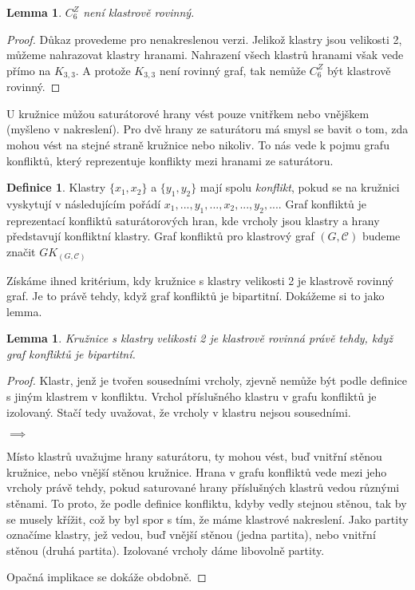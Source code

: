 \documentclass[12pt,a4report]{report}
\newtheorem{lemma}[theorem]{Lemma}
\theoremstyle{definition}
\newtheorem{defn}[theorem]{Definice}
\begin{document}
\begin{lemma}
\label{zak_minor}
$C_6^Z$ není klastrově rovinný.
\end{lemma}
\begin{proof}
Důkaz provedeme pro nenakreslenou verzi. Jelikož klastry jsou velikosti 2, můžeme nahrazovat klastry hranami. Nahrazení všech klastrů hranami však vede přímo na $K_{3,3}$. A protože $K_{3,3}$ není rovinný graf, tak nemůže $C_6^Z$ být klastrově rovinný.
\end{proof}

U kružnice můžou saturátorové hrany vést pouze vnitřkem nebo vnějškem (myšleno v nakreslení). Pro dvě hrany ze saturátoru má smysl se bavit o tom, zda mohou vést na stejné straně kružnice nebo nikoliv. To nás vede k pojmu grafu konfliktů, který reprezentuje konflikty mezi hranami ze saturátoru. 

\begin{defn}
 Klastry $\{x_1, x_2\}$ a $\{y_1, y_2\}$ mají spolu \textit{konflikt}, pokud se na kružnici vyskytují v následujícím pořádí $x_1 , ..., y_1, ..., x_2, ..., y_2, ...$. Graf konfliktů je reprezentací konfliktů saturátorových hran, kde vrcholy jsou klastry a hrany představují konfliktní klastry. Graf konfliktů pro klastrový graf $(G,\mathcal C)$ budeme značit $GK_{(G,\mathcal C)}$
\end{defn}

Získáme ihned kritérium, kdy kružnice s klastry velikosti 2 je klastrově rovinný graf. Je to právě tehdy, když graf konfliktů je bipartitní. Dokážeme si to jako lemma.

\begin{lemma}\label{lemma_ekv_graf_konf_kl_rov}Kružnice s klastry velikosti 2 je klastrově rovinná právě tehdy, když graf konfliktů je bipartitní.
\end{lemma}
\begin{proof}
Klastr, jenž je tvořen sousedními vrcholy, zjevně nemůže být podle definice s jiným klastrem v konfliktu. Vrchol příslušného klastru v grafu konfliktů je izolovaný. Stačí tedy uvažovat, že vrcholy v klastru nejsou sousedními.

$\implies$

Místo klastrů uvažujme hrany saturátoru, ty mohou vést, buď vnitřní stěnou kružnice, nebo vnější stěnou kružnice. Hrana v grafu konfliktů vede mezi jeho vrcholy právě tehdy, pokud saturované hrany příslušných klastrů vedou různými stěnami. To proto, že podle definice konfliktu, kdyby vedly stejnou stěnou, tak by se musely křížit, což by byl spor s tím, že máme klastrové nakreslení. Jako partity označíme klastry, jež vedou, buď vnější stěnou (jedna partita), nebo vnitřní stěnou (druhá partita). Izolované vrcholy dáme libovolně partity.

Opačná implikace se dokáže obdobně.
\end{proof}
\end{document}
